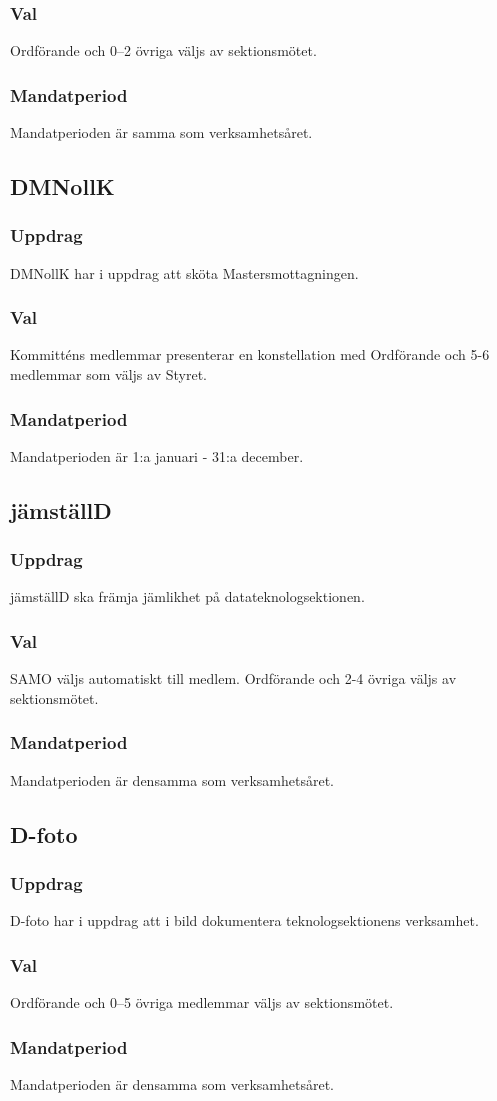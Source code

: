 \subsubsection{Val}
Ordförande och 0–2 övriga väljs av sektionsmötet.
\subsubsection{Mandatperiod}
Mandatperioden är samma som verksamhetsåret.

\subsection{DMNollK}
\subsubsection{Uppdrag}
DMNollK har i uppdrag att sköta Mastersmottagningen.
\subsubsection{Val}
Kommitténs medlemmar presenterar en konstellation med Ordförande och 5-6 medlemmar som väljs av Styret.
\subsubsection{Mandatperiod}
Mandatperioden är 1:a januari - 31:a december.

\subsection{jämställD}
\subsubsection{Uppdrag}
jämställD ska främja jämlikhet på datateknologsektionen.
\subsubsection{Val}
SAMO väljs automatiskt till medlem. Ordförande och 2-4 övriga väljs av sektionsmötet.
\subsubsection{Mandatperiod}
Mandatperioden är densamma som verksamhetsåret.

\subsection{D-foto}
\subsubsection{Uppdrag}
D-foto har i uppdrag att i bild dokumentera teknologsektionens verksamhet.
\subsubsection{Val}
Ordförande och 0--5 övriga medlemmar väljs av sektionsmötet.
\subsubsection{Mandatperiod}
Mandatperioden är densamma som verksamhetsåret.

\newpage
